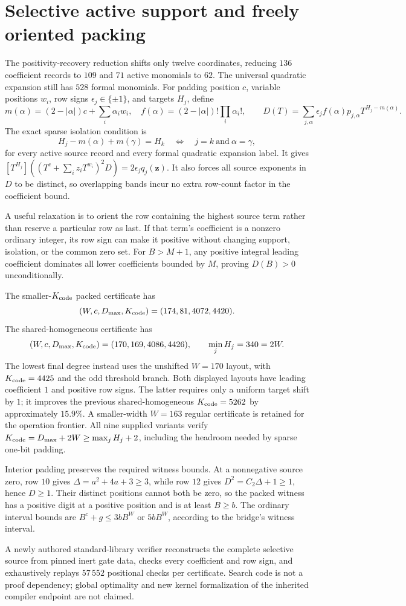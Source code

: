\section{Selective active support and freely oriented packing}
The positivity-recovery reduction shifts only twelve coordinates, reducing
$136$ coefficient records to $109$ and $71$ active monomials to $62$.
The universal quadratic expansion still has $528$ formal monomials.
For padding position $c$, variable positions $w_i$, row signs
$\epsilon_j\in\{\pm1\}$, and targets $H_j$, define
\[
 m(\alpha)=(2-|\alpha|)c+\sum_i\alpha_iw_i,\quad
 f(\alpha)=(2-|\alpha|)!\prod_i\alpha_i!,\qquad
 D(T)=\sum_{j,\alpha}\epsilon_jf(\alpha)p_{j,\alpha}
 T^{H_j-m(\alpha)}.
\]
The exact sparse isolation condition is
\[
 H_j-m(\alpha)+m(\gamma)=H_k
 \quad\Longleftrightarrow\quad j=k\ \text{and}\ \alpha=\gamma,
\]
for every active source record and every formal quadratic expansion label.
It gives
$[T^{H_j}]((T^c+\sum_i z_iT^{w_i})^2D)=2\epsilon_jq_j(\mathbf z)$.
It also forces all source exponents in $D$ to be distinct, so overlapping
bands incur no extra row-count factor in the coefficient bound.

A useful relaxation is to orient the row containing the highest source
term rather than reserve a particular row as last. If that term's
coefficient is a nonzero ordinary integer, its row sign can make it
positive without changing support, isolation, or the common zero set.
For $B>M+1$, any positive integral leading coefficient dominates all
lower coefficients bounded by $M$, proving $D(B)>0$ unconditionally.

The smaller-$K_{\rm code}$ packed certificate has
\[
 (W,c,D_{\max},K_{\rm code})=(174,81,4072,4420).
\]
The shared-homogeneous certificate has
\[
 (W,c,D_{\max},K_{\rm code})=(170,169,4086,4426),
 \qquad\min_jH_j=340=2W.
\]
The lowest final degree instead uses the unshifted $W=170$ layout,
with $K_{\rm code}=4425$ and the odd threshold branch.
Both displayed layouts have leading coefficient $1$ and positive row signs. The latter
requires only a uniform target shift by $1$; it improves the previous
shared-homogeneous $K_{\rm code}=5262$ by approximately $15.9\%$.
A smaller-width $W=163$ regular certificate is retained for the operation
frontier. All nine supplied variants verify
$K_{\rm code}=D_{\max}+2W\ge\max_jH_j+2$, including the headroom needed
by sparse one-bit padding.

Interior padding preserves the required witness bounds. At a nonnegative
source zero, row $10$ gives $\Delta=a^2+4a+3\ge3$, while row $12$ gives
$D^2=C_2\Delta+1\ge1$, hence $D\ge1$. Their distinct positions cannot
both be zero, so the packed witness has a positive digit at a positive
position and is at least $B\ge b$. The ordinary interval bounds are
$B^c+g\le3bB^W$ or $5bB^W$, according to the bridge's witness interval.

A newly authored standard-library verifier reconstructs the complete
selective source from pinned inert gate data, checks every coefficient
and row sign, and exhaustively replays $57\,552$ positional checks per
certificate. Search code is not a proof dependency; global optimality and
new kernel formalization of the inherited compiler endpoint are not claimed.
